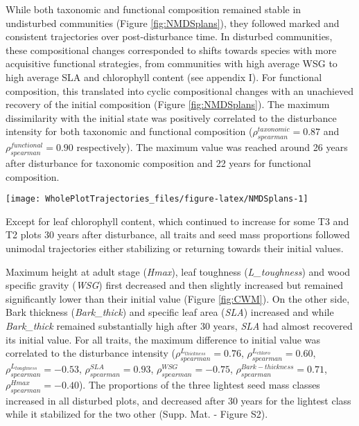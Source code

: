 \documentclass[fleqn,10pt]{ArtEcoFoG} %
\begin{document}
While both taxonomic and functional composition remained stable in
undisturbed communities (Figure \ref{fig:NMDSplans}), they followed
marked and consistent trajectories over post-disturbance time. In
disturbed communities, these compositional changes corresponded to
shifts towards species with more acquisitive functional strategies, from
communities with high average WSG to high average SLA and chlorophyll
content (see appendix I). For functional composition, this translated
into cyclic compositional changes with an unachieved recovery of the
initial composition (Figure \ref{fig:NMDSplans}). The maximum
dissimilarity with the initial state was positively correlated to the
disturbance intensity for both taxonomic and functional composition
(\(\rho_{spearman}^{taxonomic}=0.87\) and
\(\rho_{spearman}^{functional}=0.90\) respectively). The maximum value
was reached around 26 years after disturbance for taxonomic composition
and 22 years for functional composition.

\begin{figure*}

{\centering \texttt{[image: WholePlotTrajectories\_files/figure-latex/NMDSplans-1]} 

}

\caption{Plot trajectories in terms of flora composition (left panels \textbf{(a)} and \textbf{(c)}) and functional composition (right panels \textbf{(b)} and \textbf{(d)}) in a two-dimensional NMDS space. Lower panels (\textbf{(c)} and \textbf{(d)}) represent the euclidean distance to initial condition along the 30 sampled years. Colors are treatments: green (control), yellow (T1), orange (T2), red (T3) with shaded areas the credibility intervals.}\label{fig:NMDSplans}
\end{figure*}

Except for leaf chlorophyll content, which continued to increase for
some T3 and T2 plots 30 years after disturbance, all traits and seed
mass proportions followed unimodal trajectories either stabilizing or
returning towards their initial values.

Maximum height at adult stage (\emph{Hmax}), leaf toughness
(\emph{L\_toughness}) and wood specific gravity (\emph{WSG}) first
decreased and then slightly increased but remained significantly lower
than their initial value (Figure \ref{fig:CWM}). On the other side, Bark
thickness (\emph{Bark\_thick}) and specific leaf area (\emph{SLA})
increased and while \emph{Bark\_thick} remained substantially high after
30 years, \emph{SLA} had almost recovered its initial value. For all
traits, the maximum difference to initial value was correlated to the
disturbance intensity (\(\rho_{spearman}^{L_{thickness}}=0.76\),
\(\rho_{spearman}^{L_{chloro}}=0.60\),
\(\rho_{spearman}^{L_{toughness}}=-0.53\),
\(\rho_{spearman}^{SLA}=0.93\), \(\rho_{spearman}^{WSG}=-0.75\),
\(\rho_{spearman}^{Bark-thickness}=0.71\),
\(\rho_{spearman}^{Hmax}=-0.40\)). The proportions of the three lightest
seed mass classes increased in all disturbed plots, and decreased after
30 years for the lightest class while it stabilized for the two other
(Supp. Mat. - Figure S2).
\end{document}
